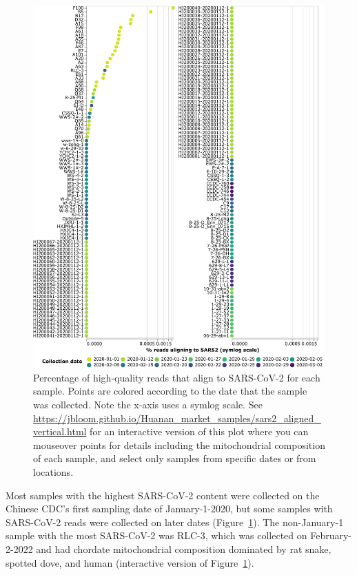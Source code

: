 \documentclass[9pt,twocolumn,twoside]{gsajnl_modified}
\begin{document}
\begin{figure}
\centerline{\includegraphics[width=0.85\linewidth]{fig2.pdf}}
\caption{
Percentage of high-quality reads that align to SARS-CoV-2 for each sample.
Points are colored according to the date that the sample was collected.
Note the x-axis uses a symlog scale.
See \url{https://jbloom.github.io/Huanan_market_samples/sars2_aligned_vertical.html} for an interactive version of this plot where you can mouseover points for details including the mitochondrial composition of each sample, and select only samples from specific dates or from locations.
\label{fig:sars2_aligned}
}
\end{figure}

Most samples with the highest SARS-CoV-2 content were collected on the Chinese CDC's first sampling date of January-1-2020, but some samples with SARS-CoV-2 reads were collected on later dates (Figure~\ref{fig:sars2_aligned}).
The non-January-1 sample with the most SARS-CoV-2 was RLC-3, which was collected on February-2-2022 and had chordate mitochondrial composition dominated by rat snake, spotted dove, and human (interactive version of Figure~\ref{fig:sars2_aligned}).
\end{document}
